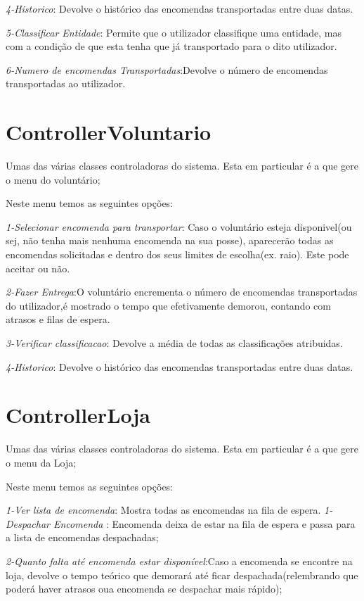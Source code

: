 \documentclass[a4paper]{report}
\begin{document}
      \textit{4-Historico}: Devolve o histórico das encomendas transportadas entre duas datas.
      
      \textit{5-Classificar Entidade}: Permite que o utilizador classifique uma entidade, mas com a condição de que esta tenha que já transportado para o dito utilizador. 
      
      \textit{6-Numero de encomendas Transportadas}:Devolve o número de encomendas transportadas ao utilizador.
    
	\section{ControllerVoluntario}
	   Umas das várias classes controladoras do sistema. Esta em particular é a que gere o menu do voluntário;
	   
	   Neste menu temos as seguintes opções:
	   
	   \textit{1-Selecionar encomenda para transportar}: Caso o voluntário esteja disponivel(ou sej, não tenha mais nenhuma encomenda na sua posse), aparecerão todas as encomendas solicitadas e dentro dos seus limites de escolha(ex. raio). Este pode aceitar ou não.
	   
	   \textit{2-Fazer Entrega}:O voluntário encrementa o número de encomendas transportadas do utilizador,é mostrado o tempo que efetivamente demorou, contando com atrasos e filas de espera.
	   
	   \textit{3-Verificar classificacao}: Devolve a média de todas as classificações atribuidas.
	   
	   \textit{4-Historico}: Devolve o histórico das encomendas transportadas entre duas datas.
	   

	\section{ControllerLoja}
	 Umas das várias classes controladoras do sistema. Esta em particular é a que gere o menu da Loja;
	 
	 Neste menu temos as seguintes opções:
	 
	 \textit{1-Ver lista de encomenda}: Mostra todas as encomendas na fila de espera.
	 \textit{1-Despachar Encomenda }: Encomenda deixa de estar na fila de espera e passa para a lista de encomendas despachadas;
	 
	 \textit{2-Quanto falta até encomenda estar disponível}:Caso a encomenda se encontre na loja, devolve o tempo teórico que demorará até ficar despachada(relembrando que poderá haver atrasos oua encomenda se despachar mais rápido);
	
\end{document}
